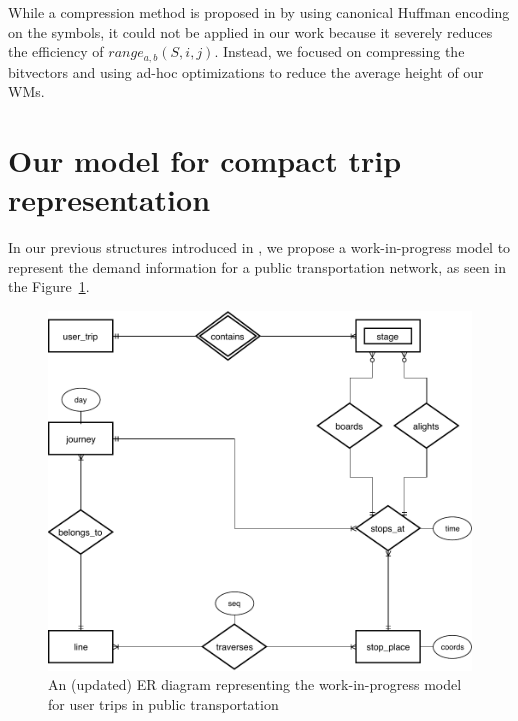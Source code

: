 \documentclass[runningheads]{llncs}
\begin{document}
While a compression method is proposed in \cite{CNO15} by using canonical Huffman encoding on the symbols, it could not be applied in our work because it severely reduces the efficiency of $range_{a,b}(S,i,j)$. Instead, we focused on compressing the bitvectors and using ad-hoc optimizations to reduce the average height of our WMs.

\section{Our model for compact trip representation}
In our previous structures introduced in \cite{brisaboa2018new}, we propose a work-in-progress model to represent the demand information for a public transportation network, as seen in the Figure~\ref{fig:er}.

\begin{figure}
\includegraphics[width=\textwidth]{NetworkER.pdf}
\caption{An (updated) ER diagram representing the work-in-progress model for user trips in public transportation}
\label{fig:er}
\end{figure}
\end{document}
